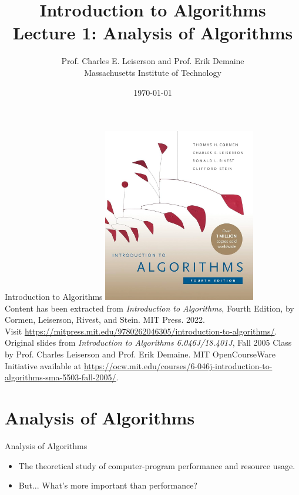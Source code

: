 \documentclass{beamer}
\title[Lecture 1]{Introduction to Algorithms \\ Lecture 1: Analysis of Algorithms}
\author{Prof. Charles E. Leiserson and Prof. Erik Demaine \\ Massachusetts Institute of Technology}
\date{\today}
\begin{document}
\frame{\titlepage}


\begin{frame}{Introduction to Algorithms}
    \centering
    \includegraphics[width=0.5\textwidth]{figures/book_cover.jpg} \\
    \vspace{5mm}
    {
        \tiny
        Content has been extracted from \textit{Introduction to Algorithms}, Fourth Edition, by Cormen, Leiserson, Rivest, and Stein. MIT Press. 2022.\\
        Visit \url{https://mitpress.mit.edu/9780262046305/introduction-to-algorithms/}.\\
        Original slides from \textit{Introduction to Algorithms 6.046J/18.401J}, Fall 2005 Class by Prof. Charles Leiserson and Prof. Erik Demaine. MIT OpenCourseWare Initiative available at \url{https://ocw.mit.edu/courses/6-046j-introduction-to-algorithms-sma-5503-fall-2005/}.\\
    }
\end{frame}

\section{Analysis of Algorithms}

\begin{frame}{Analysis of Algorithms}
    \begin{itemize}
        \item The theoretical study of computer-program performance and resource usage. 
        \item But... What’s more important than performance?
    \end{itemize}
    \vspace{32mm}
\end{frame}
\end{document}
